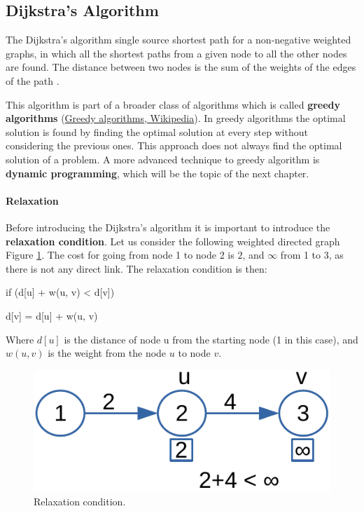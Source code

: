 \subsection{Dijkstra's Algorithm}
\label{sec:dijkstra}
The Dijkstra's algorithm single source shortest path for a non-negative weighted graphs, in which all the shortest paths from a given node to all the other nodes are found. The distance between two nodes is the sum of the weights of the edges of the path \cite{wikidijkstra}.

This algorithm is part of a broader class of algorithms which is called \textbf{greedy algorithms} \cite{wikigreedy} (\href{https://en.wikipedia.org/wiki/Greedy_algorithm}{Greedy algorithms, Wikipedia}). In greedy algorithms the optimal solution is found by finding the optimal solution at every step without considering the previous ones. This approach does not always find the optimal solution of a problem. A more advanced technique to greedy algorithm is \textbf{dynamic programming}, which will be the topic of the next chapter.

\paragraph{Relaxation}
Before introducing the Dijkstra's algorithm it is important to introduce the \textbf{relaxation condition}. Let us consider the following weighted directed graph Figure \ref{graphs_12}. The cost for going from node 1 to node 2 is \(2\), and \(\infty\) from 1 to 3, as there is not any direct link. The relaxation condition is then:

\begin{definition}
\enspace \enspace \textnormal{if (d[u] + w(u, v) < d[v])}

\enspace \enspace \enspace     \textnormal{d[v] = d[u] + w(u, v)}

Where \(d[u]\) is the distance of node u from the starting node (1 in this case), and \(w(u, v)\) is the weight from the node \(u\) to node \(v\).
\end{definition}

\begin{figure}[H]
	\begin{center}
		\includegraphics[scale=.6]{chapters/graphs/images/graphs_12.pdf}
		\caption[Relaxation condition.]{Relaxation condition.}
		\label{graphs_12}
	\end{center}
\end{figure}

